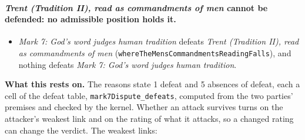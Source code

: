 \documentclass[11pt]{article}
\begin{document}
\paragraph{\emph{Trent (Tradition II), read as commandments of men} cannot be defended: no admissible position holds it.}
\begin{itemize}
\item \emph{Mark 7: God's word judges human tradition} defeats \emph{Trent (Tradition II), read as commandments of men} (\texttt{where\allowbreak{}The\allowbreak{}Mens\allowbreak{}Commandments\allowbreak{}Reading\allowbreak{}Falls}), and nothing defeats \emph{Mark 7: God's word judges human tradition}.
\end{itemize}
\par\noindent\textbf{What this rests on.} The reasons state 1 defeat and 5 absences of defeat, each a cell of the defeat table, \texttt{mark7\allowbreak{}Dispute\_\allowbreak{}defeats}, computed from the two parties' premises and checked by the kernel. Whether an attack survives turns on the attacker's weakest link and on the rating of what it attacks, so a changed rating can change the verdict. The weakest links:
\end{document}
